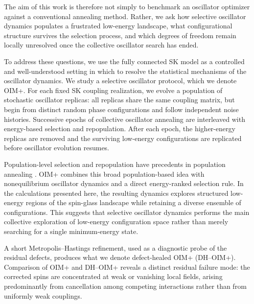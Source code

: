 \documentclass[
reprint,
amsmath,amssymb,
aps,
pre,
floatfix,
]{revtex4-2}
\begin{document}
The aim of this work is therefore not simply to benchmark an oscillator
optimizer against a conventional annealing method. Rather, we ask how
selective oscillator dynamics populates a frustrated low-energy landscape,
what configurational structure survives the selection process, and which
degrees of freedom remain locally unresolved once the collective oscillator
search has ended.

To address these questions, we use the fully connected SK model as a
controlled and well-understood setting in which to resolve the statistical
mechanisms of the oscillator dynamics. We study a selective oscillator
protocol, which we denote OIM+. For each fixed SK coupling realization, we
evolve a population of stochastic oscillator replicas: all replicas share the
same coupling matrix, but begin from distinct random phase configurations and
follow independent noise histories. Successive epochs of collective oscillator
annealing are interleaved with energy-based selection and repopulation. After
each epoch, the higher-energy replicas are removed and the surviving low-energy
configurations are replicated before oscillator evolution resumes.

Population-level selection and repopulation have precedents in population
annealing \cite{Wang2015GroundStates}. OIM+ combines this broad
population-based idea with nonequilibrium oscillator dynamics and a direct
energy-ranked selection rule. In the calculations presented here, the
resulting dynamics explores structured low-energy regions of the spin-glass
landscape while retaining a diverse ensemble of configurations. This suggests
that selective oscillator dynamics performs the main collective exploration
of low-energy configuration space rather than merely searching for a single
minimum-energy state.


A short Metropolis--Hastings refinement, used as a diagnostic probe of the
residual defects, produces what we denote defect-healed OIM+ (DH--OIM+).
Comparison of OIM+ and DH--OIM+ reveals a distinct residual failure mode:
the corrected spins are concentrated at weak or vanishing local fields,
arising predominantly from cancellation among competing interactions rather
than from uniformly weak couplings.
\end{document}
